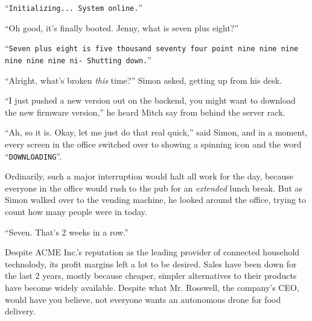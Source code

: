 \documentclass[10pt,a4paper]{article}
\newcommand{\lang}[2]{ #2 \par}
\newcommand{\ai}[2]{
	\lang{
		-- \texttt{#1}
	}{
		``\texttt{#2}''
	}
}
\newcommand{\ainame}{Jenny}
\newcommand{\mainname}{Simon}
\newcommand{\auxname}{Mitch}
\newcommand{\corpname}{ACME Inc.}
\newcommand{\ceoname}{Mr. Rosswell}
\begin{document}
\iffalse

creator approached by ceo (with police), told to add surveillance, agrees because backstory.
when sales are high, police test in showroom, criminal locked in
update rolled out, but false-triggering, and many crimes exploit centralized server
creator sees stats, is shocked, decides to disable and release as open-source


\fi

\ai{Инициализация... Система запущена.}{Initializing... System online.}
\lang{-- Так, наконец-то загрузилось. \ainame{}, сколько будет семь плюс восемь?}{``Oh good, it's finally booted. \ainame{}, what is seven plus eight?''}
\ai{Семь плюс восемь равно пять тысяч семьдесят четыре точка девять девять девять девять девять де- Выключение.}{Seven plus eight is five thousand seventy four point nine nine nine nine nine nine ni- Shutting down.}
\lang{-- Что на \emph{этот} раз сломалось? -- спросил \mainname{}, вставая из-за стола.}{``Alright, what's broken \emph{this} time?'' \mainname{} asked, getting up from his desk.}
\lang{-- Я только что выкатил новую версию на бэкенд, тебе стоит скачать новую прошивку, -- послышался голос \auxname{} из-за серверной стойки.}{``I just pushed a new version out on the backend, you might want to download the new firmware version,'' he heard \auxname{} say from behind the server rack.}
\lang{-- Ах, так и есть. Сейчас быстренько скачаю, -- сказал \mainname{}, и все экраны в офисе вмиг показали вращающийся индикатор и слово ``\texttt{ЗАГРУЗКА}''.}{``Ah, so it is. Okay, let me just do that real quick,'' said \mainname{}, and in a moment, every screen in the office switched over to showing a spinning icon and the word ``\texttt{DOWNLOADING}''.}
\lang{Обыкновенно, такое обширное прерывание остановило бы всю работу на день, потому что все ушли бы в бар на \emph{очень} длинный обеденный перерыв. Но \mainname{} пошел к торговому автомату и, оглянувшись, посчитал, сколько людей пришли сегодня.}{Ordinarily, such a major interruption would halt all work for the day, because everyone in the office would rush to the pub for an \emph{extended} lunch break. But as \mainname{} walked over to the vending machine, he looked around the office, trying to count how many people were in today.}
\lang{-- Семь. Две недели подряд уже как.}{``Seven. That's 2 weeks in a row.''}
\lang{Несмотря на то, что \corpname{} -- самый известный производитель умных устройств для дома, доходы компании оставляли желать лучшего. Продажи падали последние два года, в основном потому что более простые и более дешёвые альтернативы стали значительно доступнее. \ceoname{}, директор компании, сильно заблуждается, когда говорит, что в каждом доме должен быть автономный дрон для доставки еды.}{Despite \corpname{}'s reputation as the leading provider of connected household technolody, its profit margins left a lot to be desired. Sales have been down for the last 2 years, mostly because cheaper, simpler alternatives to their products have become widely available. Despite what \ceoname{}, the company's CEO, would have you believe, not everyone wants an autonomous drone for food delivery.}
\end{document}
